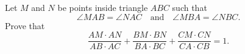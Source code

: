 Let $M$ and $N$ be points inside triangle $ABC$ such that
\[ \angle MAB = \angle NAC \quad \text{and} \quad \angle MBA = \angle NBC. \]
Prove that
\[ \frac{AM \cdot AN}{AB \cdot AC} + \frac{BM \cdot BN}{BA \cdot BC} + \frac{CM \cdot CN}{CA \cdot CB} = 1. \]
